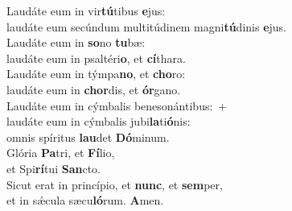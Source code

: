 \evenverse Laudáte eum in vir\textbf{tú}tibus \textbf{e}jus:~\*\\
\evenverse laudáte eum secúndum multitúdinem magni\textbf{tú}dinis \textbf{e}jus.\\
\oddverse Laudáte eum in \textbf{so}no \textbf{tu}bæ:~\*\\
\oddverse laudáte eum in psaltéri\textbf{o}, et \textbf{cí}thara.\\
\evenverse Laudáte eum in týmpa\textbf{no}, et \textbf{cho}ro:~\*\\
\evenverse laudáte eum in \textbf{chor}dis, et \textbf{ór}gano.\\
\oddverse Laudáte eum in cýmbalis benesonántibus:~+\\
\oddverse  laudáte eum in cýmbalis jubi\textbf{la}ti\textbf{ó}nis:~\*\\
\oddverse omnis spíritus \textbf{lau}det \textbf{Dó}minum.\\
\evenverse Glória \textbf{Pa}tri, et \textbf{Fí}lio,~\*\\
\evenverse et Spi\textbf{rí}tui \textbf{San}cto.\\
\oddverse Sicut erat in princípio, et \textbf{nunc}, et \textbf{sem}per,~\*\\
\oddverse et in sǽcula sæcu\textbf{ló}rum. \textbf{A}men.\\
